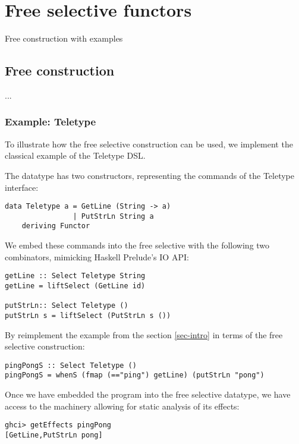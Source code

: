 \section{Free selective functors}\label{sec-free}

Free construction with examples

\subsection{Free construction}\label{sec-free-construction}

...

\subsubsection{\textbf{Example: Teletype}}

To illustrate how the free selective construction can be used, we implement the
classical example of the Teletype DSL.

The  datatype has two constructors, representing the commands of the
Teletype interface:

\begin{verbatim}
data Teletype a = GetLine (String -> a)
                | PutStrLn String a
    deriving Functor
\end{verbatim}

We embed these commands into the free selective with the following two combinators,
mimicking Haskell Prelude's IO API:

\begin{verbatim}
getLine :: Select Teletype String
getLine = liftSelect (GetLine id)

putStrLn:: Select Teletype ()
putStrLn s = liftSelect (PutStrLn s ())
\end{verbatim}

By reimplement the  example from the section \ref{sec-intro}
in terms of the free selective construction:

\begin{verbatim}
pingPongS :: Select Teletype ()
pingPongS = whenS (fmap (=="ping") getLine) (putStrLn "pong")
\end{verbatim}

Once we have embedded the  program into the free selective datatype,
we have access to the machinery allowing for static analysis of its effects:

\begin{verbatim}
ghci> getEffects pingPong
[GetLine,PutStrLn pong]
\end{verbatim}

